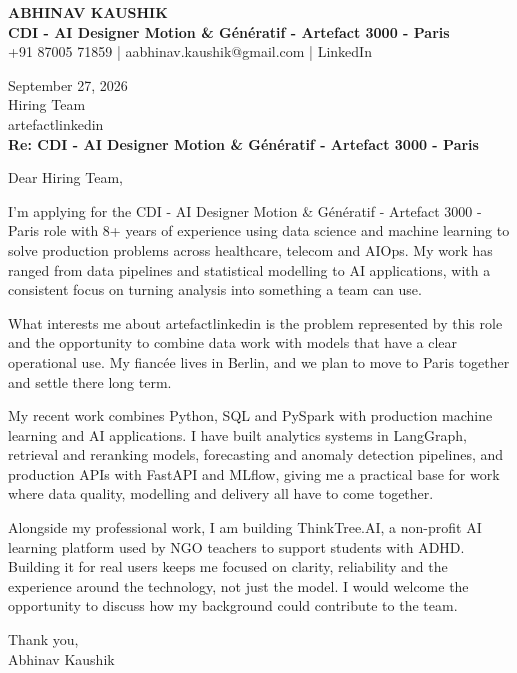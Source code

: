 \documentclass[10pt,a4paper]{article}
\begin{document}
\begin{center}
{\Large\bfseries ABHINAV KAUSHIK}\\[2pt]
{\bfseries CDI - AI Designer  Motion \& Génératif  - Artefact 3000 - Paris}\\[2pt]
+91 87005 71859 \quad | \quad aabhinav.kaushik@gmail.com \quad | \quad LinkedIn
\end{center}
\vspace{8pt}
September 27, 2026\\[6pt]
Hiring Team\\
artefactlinkedin\\[4pt]
\textbf{Re: CDI - AI Designer  Motion \& Génératif  - Artefact 3000 - Paris}

Dear Hiring Team,

I’m applying for the CDI - AI Designer  Motion \& Génératif  - Artefact 3000 - Paris role with 8+ years of experience using data science and machine learning to solve production problems across healthcare, telecom and AIOps. My work has ranged from data pipelines and statistical modelling to AI applications, with a consistent focus on turning analysis into something a team can use.

What interests me about artefactlinkedin is the problem represented by this role and the opportunity to combine data work with models that have a clear operational use. My fiancée lives in Berlin, and we plan to move to Paris together and settle there long term.

My recent work combines Python, SQL and PySpark with production machine learning and AI applications. I have built analytics systems in LangGraph, retrieval and reranking models, forecasting and anomaly detection pipelines, and production APIs with FastAPI and MLflow, giving me a practical base for work where data quality, modelling and delivery all have to come together.

Alongside my professional work, I am building ThinkTree.AI, a non-profit AI learning platform used by NGO teachers to support students with ADHD. Building it for real users keeps me focused on clarity, reliability and the experience around the technology, not just the model. I would welcome the opportunity to discuss how my background could contribute to the team.

Thank you,\\
Abhinav Kaushik
\end{document}
